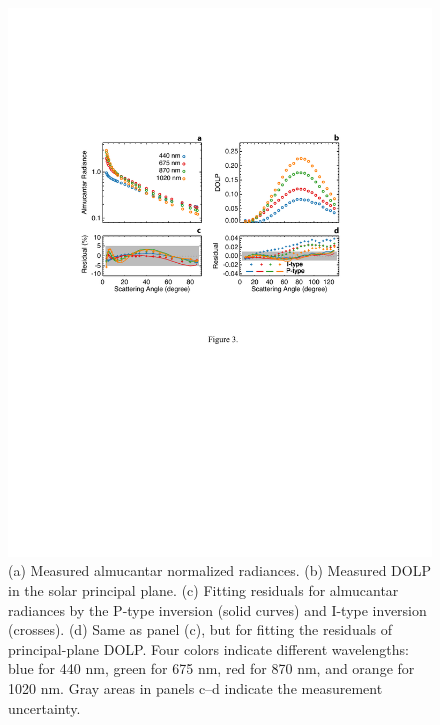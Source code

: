 \begin{figure}[t]
  \centering
  \includegraphics[width={\textwidth}]{figures/inv02.pdf}
  \caption{(a) Measured almucantar normalized radiances. (b) Measured DOLP in
the solar principal plane. (c) Fitting residuals for almucantar radiances by
the P-type inversion (solid curves) and I-type inversion (crosses). (d) Same as
panel (c), but for fitting the residuals of principal-plane DOLP. Four colors
indicate different wavelengths: blue for 440 nm, green for 675 nm, red for 870
nm, and orange for 1020 nm. Gray areas in panels c–d indicate the measurement
uncertainty.}
  \label{fig:invfit}
\end{figure}

